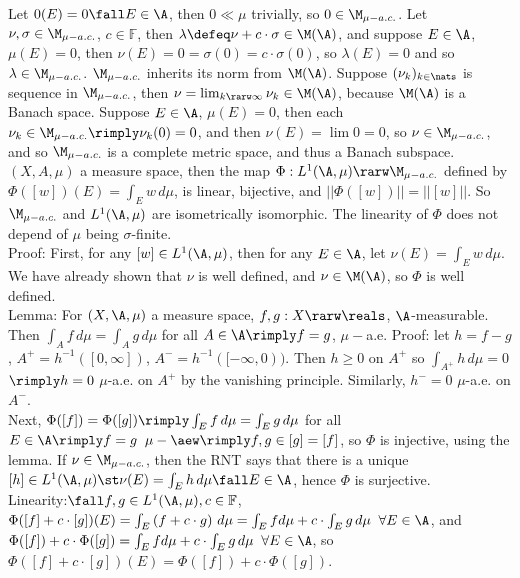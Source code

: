 \noindent Let $0(E) = 0 \fall E \in \A$, then $0 \ll \mu$ trivially, so $ 0 \in \M_{\mu-a.c.}$. Let $\nu, \sigma \in \M_{\mu-a.c.}$, $c \in \mathbb{F}$, then $\lambda \defeq \nu + c \cdot \sigma \in \M(\A)$, and suppose $E \in \A$, $\mu(E) = 0$, then $\nu(E) = 0 = \sigma(0) = c \cdot \sigma(0)$, so $\lambda(E) = 0$ and so $\lambda \in \M_{\mu-a.c.}$. $\M_{\mu-a.c.}$ inherits its norm from $\M(\A)$. Suppose $(\nu_k)_{k \in \nats}$ is sequence in $\M_{\mu-a.c.}$, then $\nu = \lim_{k \rarw \infty} \nu_k \in \M(\A)$, because $\M(\A)$ is a Banach space. Suppose $E \in \A$, $\mu(E) = 0$, then each $\nu_k \in \M_{\mu-a.c.} \rimply \nu_k(0) = 0$, and then $\nu(E) = \lim 0 = 0$, so $\nu \in \M_{\mu-a.c.}$, and so $\M_{\mu-a.c.} $ is a complete metric space, and thus a Banach subspace.\\



$(X, A, \mu)$ a measure space, then the map $\Phi: L^1(\A, \mu) \rarw \M_{\mu-a.c.}$ defined by $\Phi([w])(E) = \int_E w\, d\mu$, is linear, bijective, and $|| \Phi([w]) || = ||[w]||$. So $\M_{\mu-a.c.}$ and $L^1(\A, \mu)$ are isometrically isomorphic. The linearity of $\Phi$ does not depend of $\mu$ being $\sigma$-finite.\\

\noindent
Proof: First, for any $[w] \in L^1(\A, \mu)$, then for any $E \in \A$, let $\nu(E) = \int_E w \, d\mu$. We have already shown that $\nu$ is well defined, and $\nu \in \M(\A)$, so $\Phi$ is well defined. \\

\noindent
Lemma: For $(X, \A, \mu)$ a measure space, $f,g: X \rarw \reals$, $\A$-measurable. Then $ \int_A f \,d\mu = \int_A g \, d\mu$ for all $A \in \A \rimply f = g$, $\mu-$a.e. Proof: let $h = f - g$, $A^+ = h^{-1}( [0,\infty] )$, $A^- = h^{-1}( [-\infty,0) )$. Then $h \ge 0$ on $A^+$ so $\int_{A^+} h \,d\mu = 0$ $\rimply h=0$ $\mu$-a.e. on $A^+$ by the vanishing principle. Similarly, $h^- = 0$ $\mu$-a.e. on $A^-$. \\

\noindent
Next, $\Phi([f]) = \Phi([g]) \rimply \int_E f \, d\mu = \int_E g \, d\mu$ for all $E \in \A \rimply f=g \; \;\mu-\aew \rimply f,g \in [g] = [f]$, so $\Phi$ is injective, using the lemma. If $\nu \in \M_{\mu-a.c.}$, then the RNT says that there is a unique $[h] \in L^1(\A, \mu)  \st \nu(E) = \int_E h \, d\mu  \fall E \in \A $, hence $\Phi$ is surjective. \\

\noindent
Linearity:$\fall f,g \in L^1(\A, \mu), c \in \mathbb{F}$,  $\Phi([f] + c \cdot [g])(E) = \int_E \left( f + c \cdot g \right) \, d\mu = \int_E f d\mu + c \cdot \int_E g  \, d\mu \; \; \forall E \in \A$, and 
 $\Phi([f]) + c \cdot \Phi([g]) = \int_E f d\mu + c \cdot \int_E g  \, d\mu \; \; \forall E \in \A$, so 
 $ \Phi([f] + c \cdot [g])(E) = \Phi([f]) + c \cdot \Phi([g])$. \\
 
